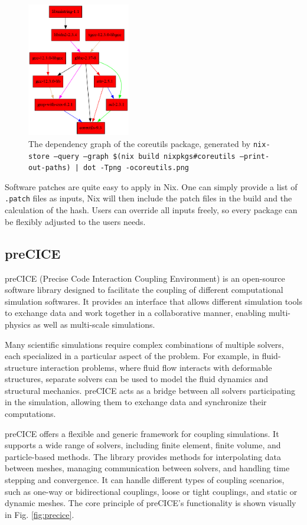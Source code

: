 \documentclass{eceasst}
\begin{document}
\begin{figure}
    \centering
    \includegraphics[width=0.4\textwidth]{figures/coreutils.png}
    \caption{The dependency graph of the coreutils package, generated by \texttt{nix-store --query --graph \$(nix build nixpkgs\#coreutils --print-out-paths) | dot -Tpng -ocoreutils.png}}
    \label{fig:nix-graph}
\end{figure}


Software patches are quite easy to apply in Nix.
One can simply provide a list of \texttt{.patch} files as inputs, Nix will then include the patch files in the build and the calculation of the hash.
Users can override all inputs freely, so every package can be flexibly adjusted to the users needs.


\subsection{preCICE}

preCICE (Precise Code Interaction Coupling Environment) is an open-source software library designed to facilitate the coupling of different computational simulation softwares.
It provides an interface that allows different simulation tools to exchange data and work together in a collaborative manner, enabling multi-physics as well as multi-scale simulations.

Many scientific simulations require complex combinations of multiple solvers, each specialized in a particular aspect of the problem.
For example, in fluid-structure interaction problems, where fluid flow interacts with deformable structures, separate solvers can be used to model the fluid dynamics and structural mechanics.
preCICE acts as a bridge between all solvers participating in the simulation, allowing them to exchange data and synchronize their computations.

preCICE offers a flexible and generic framework for coupling simulations.
It supports a wide range of solvers, including finite element, finite volume, and particle-based methods.
The library provides methods for interpolating data between meshes, managing communication between solvers, and handling time stepping and convergence.
It can handle different types of coupling scenarios, such as one-way or bidirectional couplings, loose or tight couplings, and static or dynamic meshes.
The core principle of preCICE's functionality is shown visually in Fig. \ref{fig:precice}.
\end{document}

